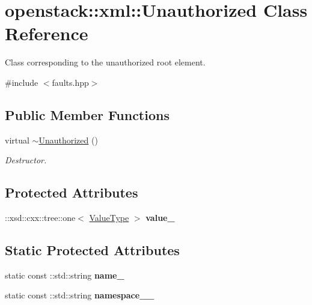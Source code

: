 \hypertarget{classopenstack_1_1xml_1_1Unauthorized}{
\section{openstack::xml::Unauthorized Class Reference}
\label{classopenstack_1_1xml_1_1Unauthorized}
}


Class corresponding to the unauthorized root element.  




{\ttfamily \#include $<$faults.hpp$>$}

\subsection*{Public Member Functions}
\begin{DoxyCompactItemize}
\item 
\hypertarget{classopenstack_1_1xml_1_1Unauthorized_ab0eb7618b2b7d0841260146f172c8898}{
virtual \hyperlink{classopenstack_1_1xml_1_1Unauthorized_ab0eb7618b2b7d0841260146f172c8898}{$\sim$Unauthorized} ()}
\label{classopenstack_1_1xml_1_1Unauthorized_ab0eb7618b2b7d0841260146f172c8898}

\begin{DoxyCompactList}\small\item\em Destructor. \item\end{DoxyCompactList}\end{DoxyCompactItemize}
\subsection*{Protected Attributes}
\begin{DoxyCompactItemize}
\item 
\hypertarget{classopenstack_1_1xml_1_1Unauthorized_a1b6a9696ece9d744a3a66e56ec211ac3}{
::xsd::cxx::tree::one$<$ \hyperlink{classopenstack_1_1xml_1_1UnauthorizedAPIFault}{ValueType} $>$ {\bfseries value\_\-}}
\label{classopenstack_1_1xml_1_1Unauthorized_a1b6a9696ece9d744a3a66e56ec211ac3}

\end{DoxyCompactItemize}
\subsection*{Static Protected Attributes}
\begin{DoxyCompactItemize}
\item 
\hypertarget{classopenstack_1_1xml_1_1Unauthorized_ab664a0ec714f9176a51ebc147e939f9e}{
static const ::std::string {\bfseries name\_\-}}
\label{classopenstack_1_1xml_1_1Unauthorized_ab664a0ec714f9176a51ebc147e939f9e}

\item 
\hypertarget{classopenstack_1_1xml_1_1Unauthorized_ad776b443094aa1932910dc06e6aad372}{
static const ::std::string {\bfseries namespace\_\-\_\-}}
\label{classopenstack_1_1xml_1_1Unauthorized_ad776b443094aa1932910dc06e6aad372}

\end{DoxyCompactItemize}
